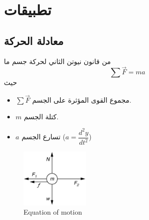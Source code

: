\chapter{تطبيقات}

\section{معادلة الحركة }

من قانون نيوتن الثاني لحركة جسم ما 
\begin{equation}
	\label{eq:newton2law}
	\sum \vec{F} = m a
\end{equation}
حيث 
\begin{itemize}
	\item $\sum \vec{F}$ مجموع القوى المؤثرة على الجسم.
	\item $m$ كتلة الجسم.
	\item $a$ تسارع الجسم ($a = \dfrac{d^2 y}{dt^2}$)
\end{itemize}

\begin{english}
	\begin{figure}[ht]
	\centering
	\includegraphics[width=0.3\textwidth]{Figures/em.jpg}
	\caption{Equation of motion}
\end{figure}
\end{english}

